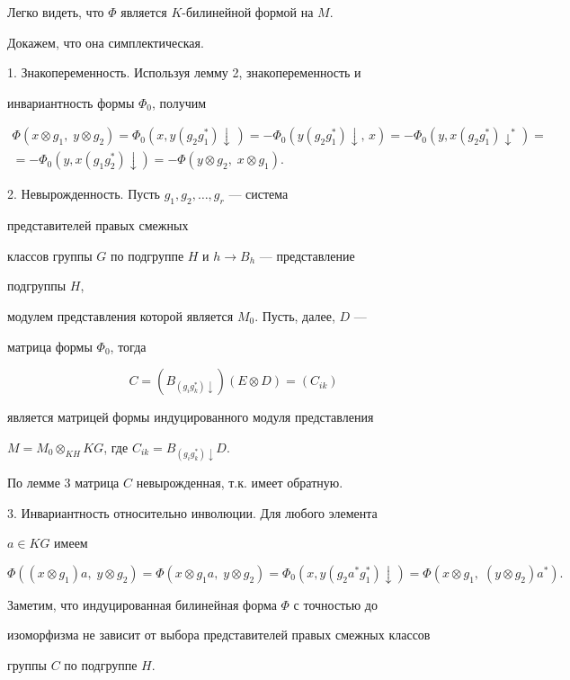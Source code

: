 \begin{pf}


Легко видеть, что $\Phi$ является $K$-билинейной формой на $M$.


Докажем, что она симплектическая.





1. Знакопеременность. Используя лемму 2, знакопеременность и


инвариантность формы $\Phi_0$, получим


\begin{multline*}


\Phi(x\otimes g_1,\; y\otimes g_2)=


\Phi_0(x,y(g_2g^*_1)\downarrow\,)=


-\Phi_0(y(g_2g^*_1)\downarrow,\,x)=


-\Phi_0(y,x(g_2g^*_1)\downarrow^*)=\\


=-\Phi_0(y,x(g_1g^*_2)\downarrow)=


-\Phi(y\otimes g_2,\; x\otimes g_1).


\end{multline*}





2. Невырожденность. Пусть $g_1,g_2,\dotsc,g_r$ --- система


представителей правых смежных


классов группы $G$ по подгруппе $H$ и $h\to B_h$ --- представление


подгруппы $H$,


модулем представления которой является $M_0$. Пусть, далее, $D$ ---


матрица формы $\Phi_0$, тогда


$$


C=(B_{(g_i g^*_k)\downarrow})(E\otimes D)=(C_{ik})


$$


является матрицей формы индуцированного модуля представления


$M=M_0\otimes_{KH}KG$, где $C_{ik}=B_{(g_ig^*_k)\downarrow}D$.


По лемме 3 матрица $C$ невырожденная, т.к. имеет обратную.





3. Инвариантность относительно инволюции. Для любого элемента


$a\in KG$ имеем


$$


\Phi((x\otimes g_1)a,\; y\otimes g_2)=


\Phi(x\otimes g_1a,\; y\otimes g_2)=


\Phi_0(x,y(g_2a^*g^*_1)\downarrow)=


\Phi(x\otimes g_1,\; (y\otimes g_2)a^*).


$$


Заметим, что индуцированная билинейная форма $\Phi$ с точностью до


изоморфизма не зависит от выбора представителей правых смежных классов


группы $C$ по подгруппе $H$.


\end{pf}
